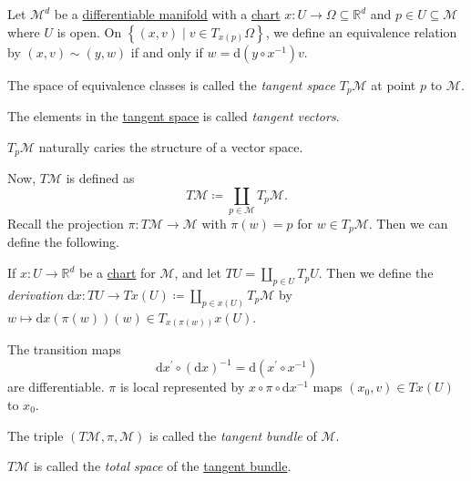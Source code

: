 \begin{definition*}
	Let \(\mathcal{M}^d \) be a \hyperref[def:smooth-manifold]{differentiable manifold} with a \hyperref[def:coordinate-chart]{chart} \(x\colon U \to \Omega \subseteq \mathbb{R} ^d\) and \(p\in U \subseteq \mathcal{M} \) where \(U\) is open. On \(\left\{ (x, v) \mid v\in T_{x(p)}\Omega \right\}\), we define an equivalence relation by \((x, v)\sim (y, w)\) if and only if \(w = \mathrm{d} (y \circ x ^{-1} )v\).

	\begin{definition}\label{def:tangent-space}
		The space of equivalence classes is called the \emph{tangent space} \(T_p \mathcal{M} \) at point \(p\) to \(\mathcal{M} \).
	\end{definition}
	\begin{definition}\label{def:tangent-vector}
		The elements in the \hyperref[def:tangent-space]{tangent space} is called \emph{tangent vectors}.
	\end{definition}
\end{definition*}

\begin{remark}
	\(T_p \mathcal{M} \) naturally caries the structure of a vector space.
\end{remark}

Now, \(T \mathcal{M} \) is defined as
\[
	T\mathcal{M} \coloneqq \coprod _{p\in \mathcal{M} }T_p \mathcal{M} .
\]
Recall the projection \(\pi \colon T\mathcal{M} \to  \mathcal{M} \) with \(\pi (w) = p\) for \(w\in T_p \mathcal{M} \). Then we can define the following.

\begin{definition}[Derivation]\label{def:derivation}
	If \(x\colon U \to  \mathbb{R} ^d\) be a \hyperref[def:coordinate-chart]{chart} for \(\mathcal{M} \), and let \(TU = \coprod_{p\in U} T_p U\). Then we define the \emph{derivation} \(\mathrm{d} x\colon TU \to  T x(U) \coloneqq \coprod_{p\in x(U)} T_p \mathcal{M} \) by \(w \mapsto \mathrm{d} x(\pi (w))(w)\in T_{x(\pi (w))} x(U)\).
\end{definition}

The transition maps
\[
	\mathrm{d} x^\prime \circ (\mathrm{d} x)^{-1}
	= \mathrm{d} (x^\prime \circ x ^{-1} )
\]
are differentiable. \(\pi \) is local represented by \(x \circ \pi \circ \mathrm{d} x ^{-1} \) maps \((x_0, v)\in Tx(U)\) to \(x_0\).

\begin{definition}\label{def:tangent-bundle}
	The triple \((T\mathcal{M} , \pi , \mathcal{M} )\) is called the \emph{tangent bundle} of \(\mathcal{M} \).

	\begin{definition}\label{def:tangent-bundle-total-space}
		\(T\mathcal{M} \) is called the \emph{total space} of the \hyperref[def:tangent-bundle]{tangent bundle}.
	\end{definition}
\end{definition}

